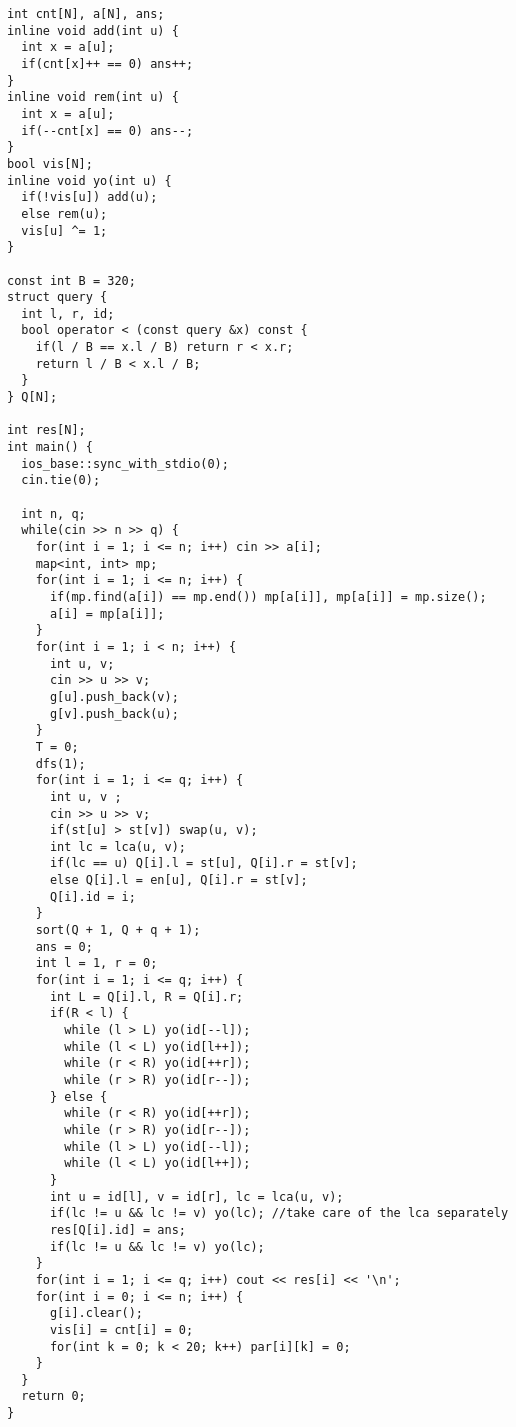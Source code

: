 \documentclass[10pt,a4paper,onesided]{article}
\begin{document}
\begin{multicols*}{3}
\begin{lstlisting}
int cnt[N], a[N], ans;
inline void add(int u) {
  int x = a[u];
  if(cnt[x]++ == 0) ans++;
}
inline void rem(int u) {
  int x = a[u];
  if(--cnt[x] == 0) ans--;
}
bool vis[N];
inline void yo(int u) {
  if(!vis[u]) add(u);
  else rem(u);
  vis[u] ^= 1;
}

const int B = 320;
struct query {
  int l, r, id;
  bool operator < (const query &x) const {
    if(l / B == x.l / B) return r < x.r;
    return l / B < x.l / B;
  }
} Q[N];

int res[N];
int main() {
  ios_base::sync_with_stdio(0);
  cin.tie(0);

  int n, q;
  while(cin >> n >> q) {
    for(int i = 1; i <= n; i++) cin >> a[i];
    map<int, int> mp;
    for(int i = 1; i <= n; i++) {
      if(mp.find(a[i]) == mp.end()) mp[a[i]], mp[a[i]] = mp.size();
      a[i] = mp[a[i]];
    }
    for(int i = 1; i < n; i++) {
      int u, v;
      cin >> u >> v;
      g[u].push_back(v);
      g[v].push_back(u);
    }
    T = 0;
    dfs(1);
    for(int i = 1; i <= q; i++) {
      int u, v ;
      cin >> u >> v;
      if(st[u] > st[v]) swap(u, v);
      int lc = lca(u, v);
      if(lc == u) Q[i].l = st[u], Q[i].r = st[v];
      else Q[i].l = en[u], Q[i].r = st[v];
      Q[i].id = i;
    }
    sort(Q + 1, Q + q + 1);
    ans = 0;
    int l = 1, r = 0;
    for(int i = 1; i <= q; i++) {
      int L = Q[i].l, R = Q[i].r;
      if(R < l) {
        while (l > L) yo(id[--l]);
        while (l < L) yo(id[l++]);
        while (r < R) yo(id[++r]);
        while (r > R) yo(id[r--]);
      } else {
        while (r < R) yo(id[++r]);
        while (r > R) yo(id[r--]);
        while (l > L) yo(id[--l]);
        while (l < L) yo(id[l++]);
      }
      int u = id[l], v = id[r], lc = lca(u, v);
      if(lc != u && lc != v) yo(lc); //take care of the lca separately
      res[Q[i].id] = ans;
      if(lc != u && lc != v) yo(lc);
    }
    for(int i = 1; i <= q; i++) cout << res[i] << '\n';
    for(int i = 0; i <= n; i++) {
      g[i].clear();
      vis[i] = cnt[i] = 0;
      for(int k = 0; k < 20; k++) par[i][k] = 0;
    }
  }
  return 0;
}
\end{lstlisting}

\end{multicols*}
\end{document}
